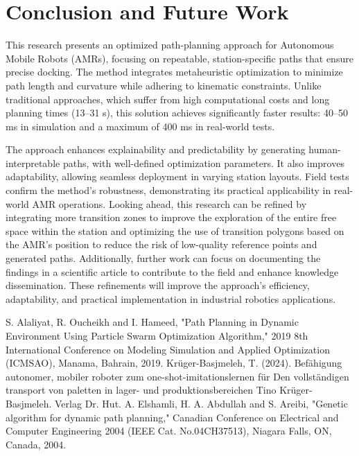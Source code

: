 \documentclass{amam}                %
\begin{document}
\section{Conclusion and Future Work}
This research presents an optimized path-planning approach for Autonomous Mobile Robots (AMRs), focusing on repeatable, station-specific paths that ensure precise docking. The method integrates metaheuristic optimization to minimize path length and curvature while adhering to kinematic constraints. Unlike traditional approaches, which suffer from high computational costs and long planning times (13–31 s), this solution achieves significantly faster results: 40–50 ms in simulation and a maximum of 400 ms in real-world tests.

The approach enhances explainability and predictability by generating human-interpretable paths, with well-defined optimization parameters. It also improves adaptability, allowing seamless deployment in varying station layouts. Field tests confirm the method’s robustness, demonstrating its practical applicability in real-world AMR operations. Looking ahead, this research can be refined by integrating more transition zones to improve the exploration of the entire free space within the station and optimizing the use of transition polygons based on the AMR’s position to reduce the risk of low-quality reference points and generated paths. Additionally, further work can focus on documenting the findings in a scientific article to contribute to the field and enhance knowledge dissemination. These refinements will improve the approach’s efficiency, adaptability, and practical implementation in industrial robotics applications.

\begin{thebibliography}{9}
 S. Alaliyat, R. Oucheikh and I. Hameed, "Path Planning in Dynamic Environment Using Particle Swarm Optimization Algorithm," 2019 8th International Conference on Modeling Simulation and Applied Optimization (ICMSAO), Manama, Bahrain, 2019.
 Kr\"uger-Basjmeleh, T. (2024). Bef\"ahigung autonomer, mobiler roboter zum one-shot-imitationslernen f\"ur 
Den vollst\"andigen transport von paletten in lager- und produktionsbereichen Tino Kr\"uger-Basjmeleh. Verlag Dr. Hut.
 A. Elshamli, H. A. Abdullah and S. Areibi, "Genetic algorithm for dynamic path planning," Canadian Conference on Electrical and Computer Engineering 2004 (IEEE Cat. No.04CH37513), 
Niagara Falls, ON, Canada, 2004.
\end{thebibliography}
\end{document}
